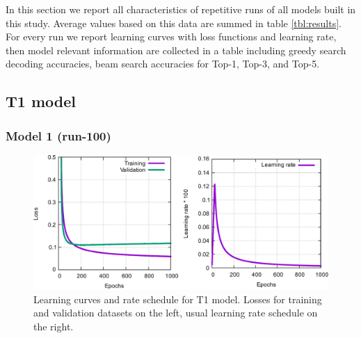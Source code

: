 \documentclass{article}
\begin{document}
In this section we report all characteristics of repetitive runs of all models built in this study. Average values based on this data are summed in table \ref{tbl:results}. For every run we report learning curves with loss functions and learning rate, then model relevant information are collected in a table including greedy search decoding accuracies, beam search accuracies for Top-1, Top-3, and Top-5.

\subsection{T1 model} 
\subsubsection{Model 1 (run-100)}
  
\begin{figure}[h!]
  \centering
  \includegraphics[width = 16.5cm]{images/t1-1.pdf}
  \caption{Learning curves and rate schedule for T1 model. Losses for training and validation datasets on the left, usual learning rate schedule on the right.}
  \label{fig:t11}
\end{figure}
\end{document}
